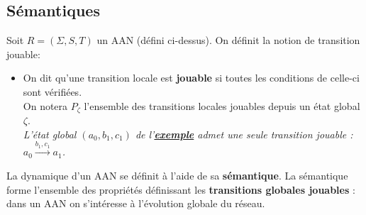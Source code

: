 \documentclass[12pt,a4paper]{article}
\begin{document}
\subsection{Sémantiques}
\hypertarget{semantiques}{Soit $R = (\Sigma,S,T)$ un AAN (défini ci-dessus). On définit la notion de transition jouable:}
\begin{itemize}
	\item On dit qu'une transition locale est \textbf{jouable} si toutes les conditions de celle-ci sont vérifiées.\\
	On notera $P_{\zeta}$ l'ensemble des transitions locales jouables depuis un état global $\zeta$.\\
	\emph{L'état global $(a_0,b_1,c_1)$ de l'\hyperlink{exemple}{\textbf{exemple}} admet une seule transition jouable : $a_0\xrightarrow{b_1,c_1} a_1$.}
\end{itemize}
La dynamique d'un AAN se définit à l'aide de sa \textbf{sémantique}. La sémantique forme l'ensemble des propriétés définissant les \textbf{transitions globales jouables} : dans un AAN on s'intéresse à l'évolution globale du réseau.
\end{document}
